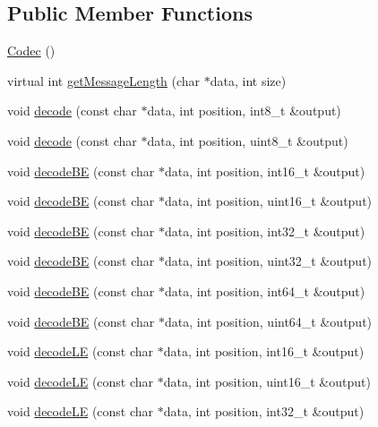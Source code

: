 \subsection*{Public Member Functions}
\begin{DoxyCompactItemize}
\item 
\hyperlink{classMetal_1_1Codec_a439fd8e827fabe656f49a7a043ab98d0}{Codec} ()
\item 
virtual int \hyperlink{classMetal_1_1Codec_a4d532631bde9029d9b5875fccaa5934e}{get\+Message\+Length} (char $\ast$data, int size)
\item 
void \hyperlink{classMetal_1_1Codec_a5b9970f32f2ff95981794993e2293011}{decode} (const char $\ast$data, int position, int8\+\_\+t \&output)
\item 
void \hyperlink{classMetal_1_1Codec_abf3b5c0af60d724c810b72b7dec909ee}{decode} (const char $\ast$data, int position, uint8\+\_\+t \&output)
\item 
void \hyperlink{classMetal_1_1Codec_a3f6d5f3018ae686f80512ad88e9a3329}{decode\+B\+E} (const char $\ast$data, int position, int16\+\_\+t \&output)
\item 
void \hyperlink{classMetal_1_1Codec_a2d51b5e2c7ab2d27ab12de4ac62e9eca}{decode\+B\+E} (const char $\ast$data, int position, uint16\+\_\+t \&output)
\item 
void \hyperlink{classMetal_1_1Codec_aa858a2edfd1227118d696f906746e7a1}{decode\+B\+E} (const char $\ast$data, int position, int32\+\_\+t \&output)
\item 
void \hyperlink{classMetal_1_1Codec_a84257d127b1918965b47e7df825fcfcb}{decode\+B\+E} (const char $\ast$data, int position, uint32\+\_\+t \&output)
\item 
void \hyperlink{classMetal_1_1Codec_a992488cf4e72ff2e26644ee0b719d7a3}{decode\+B\+E} (const char $\ast$data, int position, int64\+\_\+t \&output)
\item 
void \hyperlink{classMetal_1_1Codec_a4af4488934bd2dd20dcc82fbef75cca5}{decode\+B\+E} (const char $\ast$data, int position, uint64\+\_\+t \&output)
\item 
void \hyperlink{classMetal_1_1Codec_a9de32d0f9bbd0c25d3970b1fd748eb08}{decode\+L\+E} (const char $\ast$data, int position, int16\+\_\+t \&output)
\item 
void \hyperlink{classMetal_1_1Codec_afc62b66910d365f4cddcdc2d869371ea}{decode\+L\+E} (const char $\ast$data, int position, uint16\+\_\+t \&output)
\item 
void \hyperlink{classMetal_1_1Codec_ac8f4b899ca5f19400e7acbbf8ba28f33}{decode\+L\+E} (const char $\ast$data, int position, int32\+\_\+t \&output)

\end{DoxyCompactItemize}
